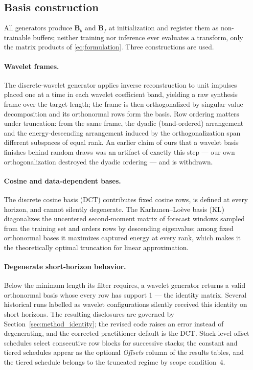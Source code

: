\subsection{Basis construction}
\label{sec:method_basis}

All generators produce $\mathbf{B}_b$ and $\mathbf{B}_f$ at initialization
and register them as non-trainable buffers; neither training nor inference
ever evaluates a transform, only the matrix products of
\eqref{eq:formulation}. Three constructions are used.

\paragraph{Wavelet frames.} The discrete-wavelet generator applies inverse
reconstruction to unit impulses placed one at a time in each wavelet
coefficient band, yielding a raw synthesis frame over the target length; the
frame is then orthogonalized by singular-value decomposition and its
orthonormal rows form the basis. Row ordering matters under truncation: from
the same frame, the dyadic (band-ordered) arrangement and the
energy-descending arrangement induced by the orthogonalization span different
subspaces of equal rank. An earlier claim of ours that a wavelet basis finishes
behind random draws was an artifact of exactly this step --- our own
orthogonalization destroyed the dyadic ordering --- and is withdrawn.

\paragraph{Cosine and data-dependent bases.} The discrete cosine basis (DCT)
contributes fixed cosine rows, is defined at every horizon, and cannot
silently degenerate. The Karhunen--Lo\`eve basis (KL) diagonalizes the
uncentered second-moment matrix of forecast windows sampled from the training
set and orders rows by descending eigenvalue; among fixed orthonormal bases
it maximizes captured energy at every rank, which makes it the theoretically
optimal truncation for linear approximation.

\paragraph{Degenerate short-horizon behavior.} Below the minimum length its
filter requires, a wavelet generator returns a valid orthonormal basis whose
every row has support 1 --- the identity matrix. Several historical runs
labelled as wavelet configurations silently received this identity on short
horizons. The resulting disclosures are governed by
Section~\ref{sec:method_identity}; the revised code raises an error instead
of degenerating, and the corrected practitioner default is the DCT.
Stack-level offset schedules select consecutive row blocks for successive
stacks; the constant and tiered schedules appear as the optional
\emph{Offsets} column of the results tables, and the tiered schedule belongs
to the truncated regime by scope condition~4.

